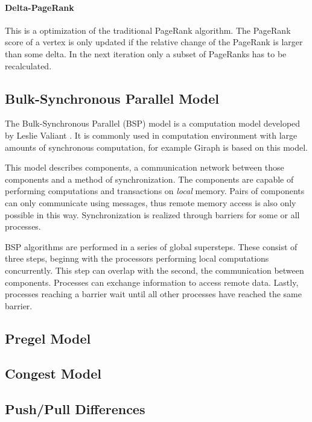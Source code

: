 \paragraph{Delta-PageRank}
This is a optimization of the traditional PageRank algorithm. The PageRank score of a vertex is only updated if the relative change of the PageRank is larger than some delta. In the next iteration only a subset of PageRanks has to be recalculated.

\subsection{Bulk-Synchronous Parallel Model}
\label{sec:bsp}
The Bulk-Synchronous Parallel (BSP) model is a computation model developed by Leslie Valiant \cite{bsp}. It is commonly used in computation environment with large amounts of synchronous computation, for example Giraph is based on this model.

This model describes components, a communication network between those components and a method of synchronization.
The components are capable of performing computations and transactions on \emph{local} memory. Pairs of components can only communicate using messages, thus remote memory access is also only possible in this way.
Synchronization is realized through barriers for some or all processes.

BSP algorithms are performed in a series of global supersteps. These consist of three steps, beginng with the processors performing local computations concurrently.
This step can overlap with the second, the communication between components. Processes can exchange information to access remote data.
Lastly, processes reaching a barrier wait until all other processes have reached the same barrier.

\subsection{Pregel Model}




\subsection{Congest Model}



\subsection{Push/Pull Differences}
